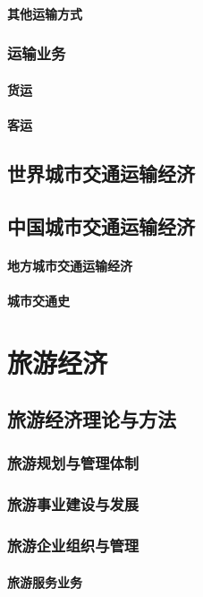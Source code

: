 \documentclass[UTF8]{../../RepresentationUniverse}
\begin{document}
        \subsubsection{其他运输方式}
    \subsection{运输业务}
        \subsubsection{货运}
        \subsubsection{客运}
\section{世界城市交通运输经济}
\section{中国城市交通运输经济}
    \subsubsection{地方城市交通运输经济}
    \subsubsection{城市交通史}



\chapter{旅游经济}
\section{旅游经济理论与方法}
    \subsection{旅游规划与管理体制}
    \subsection{旅游事业建设与发展}
    \subsection{旅游企业组织与管理}
        \subsubsection{旅游服务业务}
\end{document}
